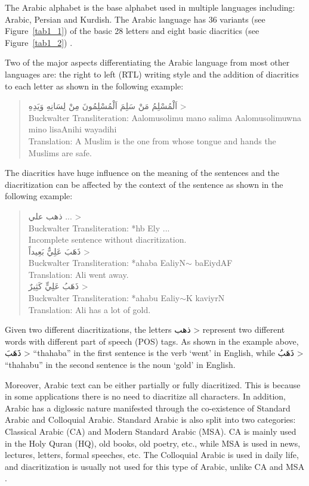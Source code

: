 \documentclass[conference]{IEEEtran}
\begin{document}
The Arabic alphabet is the base alphabet used in multiple languages including: Arabic, Persian and Kurdish. The Arabic language has 36 variants (see Figure~\ref{tab1_1}) of the basic 28 letters and eight basic diacritics (see Figure~\ref{tab1_2}) \cite{abandah2015automatic}.

Two of the major aspects differentiating the Arabic language from most other languages are: the right to left (RTL) writing style and the addition of diacritics to each letter as shown in the following example:
\begin{quote}
\centering
{}\<
اَلْمُسْلِمُ مَنْ سَلِمَ اَلْمُسْلِمُونَ مِنْ لِسَانِهِ وَيَدِهِ
> \\
Buckwalter Transliteration: Aalomusolimu mano salima Aalomusolimuwna mino lisaAnihi wayadihi \\
Translation: A Muslim is the one from whose tongue
and hands the Muslims are safe.
\end{quote}

The diacritics have huge influence on the meaning of the sentences and the diacritization can be affected by the context of the sentence as shown in the following example:
\begin{quote}
\centering
\<
ذهب علي ...
> \\
Buckwalter Transliteration: *hb Ely ... \\
Incomplete sentence without diacritization. \\
\<
ذَهَبَ عَلِيٌّ بَعِيداً
>\\
Buckwalter Transliteration: *ahaba EaliyN$\sim$ baEiydAF \\
Translation: Ali went away. \\
\<
ذَهَبُ عَلِيٍّ كَثِيرٌ
> \\
Buckwalter Transliteration: *ahabu Ealiy$\sim$K kaviyrN \\
Translation: Ali has a lot of gold.
\end{quote}
Given two different diacritizations, the letters
\<
ذهب 
>
represent two different words with different part of speech (POS) tags. As shown in the example above,
\<
ذَهَبَ 
>
``thahaba'' in the first sentence is the verb `went' in English, while
\<
ذَهَبُ
>
``thahabu'' in the second sentence is the noun `gold' in English.

Moreover, Arabic text can be either partially or fully diacritized. This is because in some applications there is no need to diacritize all characters. In addition, Arabic has a diglossic nature manifested through the co-existence of Standard Arabic and Colloquial Arabic. Standard Arabic is also split into two categories: Classical Arabic (CA) and Modern Standard Arabic (MSA). CA is mainly used in the Holy Quran (HQ), old books, old poetry, etc., while MSA is used in news, lectures, letters, formal speeches, etc. The Colloquial Arabic is used in daily life, and diacritization is usually not used for this type of Arabic, unlike CA and MSA \cite{habash2010introduction}.
\end{document}
